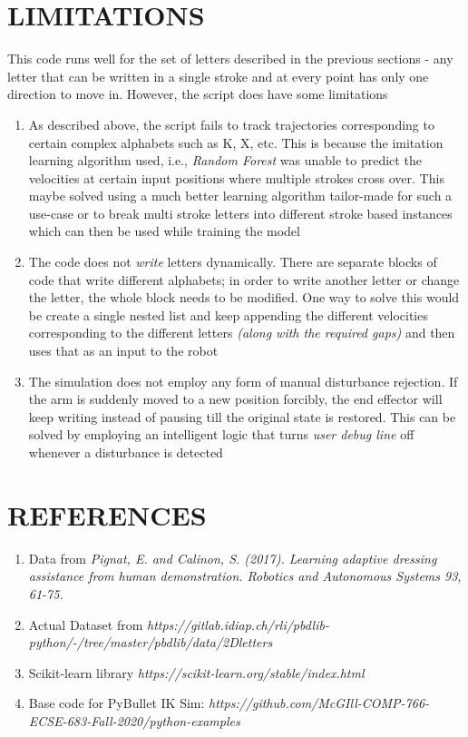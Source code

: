 \documentclass[a4paper]{article}
\begin{document}
\section{LIMITATIONS}

This code runs well for the set of letters described in the previous sections - any letter that can be written in a single stroke and at every point has only one direction to move in. However, the script does have some limitations
\begin{enumerate}
    \item As described above, the script fails to track trajectories corresponding to certain complex alphabets such as K, X, etc. This is because the imitation learning algorithm used, i.e., {\it Random Forest} was unable to predict the velocities at certain input positions where multiple strokes cross over. This maybe solved using a much better learning algorithm tailor-made for such a use-case or to break multi stroke letters into different stroke based instances which can then be used while training the model
    \item The code does not {\it write} letters dynamically. There are separate blocks of code that write different alphabets; in order to write another letter or change the letter, the whole block needs to be modified. One way to solve this would be create a single nested list and keep appending the different velocities corresponding to the different letters {\it (along with the required gaps)} and then uses that as an input to the robot
    \item The simulation does not employ any form of manual disturbance rejection. If the arm is suddenly moved to a new position forcibly, the end effector will keep writing instead of pausing till the original state is restored. This can be solved by employing an intelligent logic that turns {\it user debug line} off whenever a disturbance is detected
\end{enumerate}

\bigskip

\section{REFERENCES}
\begin{enumerate}
    \item Data from { \it Pignat, E. and Calinon, S. (2017). Learning adaptive dressing assistance from human demonstration. Robotics and Autonomous Systems 93, 61-75.}
    \item Actual Dataset from {\it https://gitlab.idiap.ch/rli/pbdlib-python/-/tree/master/pbdlib/data/2Dletters}
    \item Scikit-learn library {\it https://scikit-learn.org/stable/index.html}
    \item Base code for PyBullet IK Sim: {\it https://github.com/McGIll-COMP-766-ECSE-683-Fall-2020/python-examples}
\end{enumerate}

\end{document}
